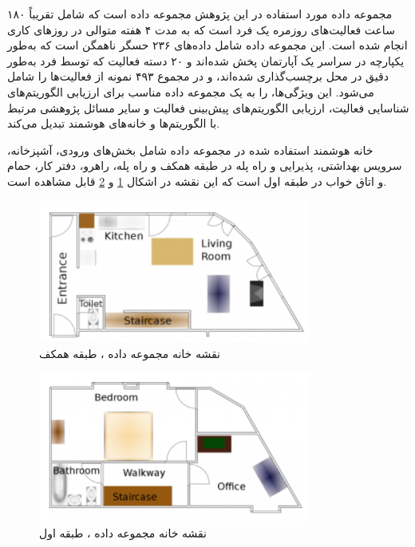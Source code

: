مجموعه داده مورد استفاده در این پژوهش مجموعه داده  \cite{xyz6} است که شامل تقریباً ۱۸۰ ساعت فعالیت‌های روزمره یک فرد است که به مدت ۴ هفته متوالی در روزهای کاری انجام شده است. این مجموعه داده شامل داده‌های ۲۳۶ حسگر ناهمگن است که به‌طور یکپارچه در سراسر یک آپارتمان پخش شده‌اند و ۲۰ دسته فعالیت که توسط فرد به‌طور دقیق در محل برچسب‌گذاری شده‌اند، و در مجموع ۴۹۳ نمونه از فعالیت‌ها را شامل می‌شود. این ویژگی‌ها،  را به یک مجموعه داده مناسب برای ارزیابی الگوریتم‌های شناسایی فعالیت، ارزیابی الگوریتم‌های پیش‌بینی فعالیت و سایر مسائل پژوهشی مرتبط با الگوریتم‌ها و خانه‌های هوشمند تبدیل می‌کند.

خانه هوشمند استفاده شده در مجموعه داده  شامل بخش‌های ورودی، آشپزخانه، سرویس بهداشتی، پذیرایی و راه پله در طبقه همکف و راه پله، راهرو، دفتر کار، حمام و اتاق خواب در طبقه اول است که این نقشه در اشکال \ref{fig:fO4H1} و  \ref{fig:fO4H2} قابل مشاهده است.

\begin{figure}[H]
\centerline{\includegraphics[width=0.8\textwidth]{figs/fO4H1.png}}
\caption[نقشه خانه مجموعه داده ، طبقه همکف]{نقشه خانه مجموعه داده ، طبقه همکف \cite{xyz6}}
\label{fig:fO4H1}
\end{figure}

\begin{figure}[H]
\centerline{\includegraphics[width=0.8\textwidth]{figs/fO4H2.png}}
\caption[نقشه خانه مجموعه داده ، طبقه اول]{نقشه خانه مجموعه داده ، طبقه اول \cite{xyz6}}
\label{fig:fO4H2}
\end{figure}

